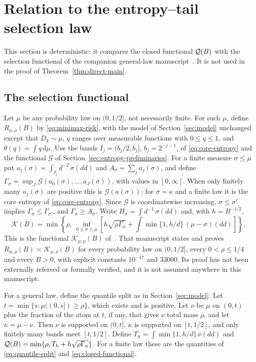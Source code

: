 \section{Relation to the entropy--tail selection law}\label{sec:comparison}
This section is deterministic: it compares the closed functional
$\mathcal Q(B)$ with the selection functional of the companion general-law
manuscript~\cite{gl}. It is not used in the proof of
Theorem~\ref{thm:direct-main}.

\subsection{The selection functional}
Let $\mu$ be any probability law on $(0,1/2]$, not necessarily finite.
For such $\mu$, define $R_{\mu,\rho}(B)$ by \eqref{eq:minimax-risk},
with the model of Section~\ref{sec:model} unchanged except that
$D_k\sim\mu$, $q$ ranges over measurable functions with $0\le q\le1$,
and $\theta(q)=\int q\,d\mu$. Use the bands $I_j=(b_j/2,b_j]$, $b_j=2^{-j-1}$, of
\eqref{eq:core-entropy} and the functional $\mathcal G$ of
Section~\ref{sec:entropy-preliminaries}. For a finite measure
$\sigma\le\mu$ put $a_j(\sigma)=\int_{I_j}d^{-2}\,\sigma(dd)$ and
$A_\sigma=\sum_ja_j(\sigma)$, and define
$\Gamma_\sigma=\sup_J\mathcal G(a_0(\sigma),\ldots,a_J(\sigma))$,
with values in $[0,\infty]$. When only finitely many $a_j(\sigma)$ are
positive this is $\mathcal G(a(\sigma))$; for $\sigma=\kappa$ and a finite
law it is the core entropy of \eqref{eq:core-entropy}. Since $\mathcal G$
is coordinatewise increasing, $\sigma\le\sigma'$ implies
$\Gamma_\sigma\le\Gamma_{\sigma'}$, and $\Gamma_\sigma\ge A_\sigma$.
Write $H_\sigma=\int d^{-1}\,\sigma(dd)$ and, with $h=B^{-1/2}$,
\begin{equation}\label{eq:selection-functional}
 \mathcal K(B)=\min\left\{\rho,\ \inf_{0\le\sigma\le\mu}
 \left[h\sqrt{\rho\Gamma_\sigma}
       +\int\min\{1,h/d\}\,(\mu-\sigma)(dd)\right]\right\}.
\end{equation}
This is the functional $\mathcal K_{\mu,\rho}(B)$ of~\cite{gl}. That
manuscript states and proves $R_{\mu,\rho}(B)\asymp\mathcal K_{\mu,\rho}(B)$
for every probability law on $(0,1/2]$, every $0<\rho\le1/4$ and every
$B>0$, with explicit constants $10^{-17}$ and $33000$. Its proof has not
been externally refereed or formally verified, and it is not assumed
anywhere in this manuscript.

For a general law, define the quantile split as in
Section~\ref{sec:model}. Let $t=\min\{s:\mu((0,s])\ge\rho\}$, which
exists and is positive. Let $\nu$ be $\mu$ on $(0,t)$ plus the fraction
of the atom at $t$, if any, that gives $\nu$ total mass $\rho$, and let
$\kappa=\mu-\nu$. Then $\nu$ is supported on $(0,t]$, $\kappa$ is
supported on $[t,1/2]$, and only finitely many bands meet $[t,1/2]$.
Define $T_h=\int\min\{1,h/d\}\,\nu(dd)$ and
$\mathcal Q(B)=\min\{\rho,T_h+h\sqrt{\rho\Gamma_\kappa}\}$. For a finite law these
are the quantities of \eqref{eq:quantile-split}
and \eqref{eq:closed-functional}.

